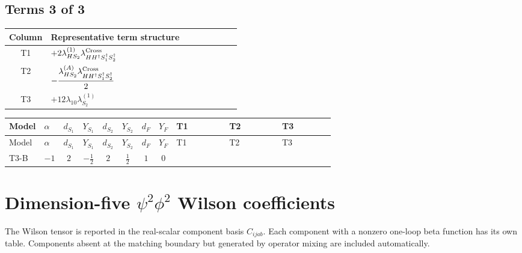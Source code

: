 \documentclass[8pt]{article}
\begin{document}
\begin{landscape}
\subsection*{Terms 3 of 3}
\begin{center}
\begin{tabular}{@{}c >{\raggedright\arraybackslash}p{0.82\linewidth}@{}}
\toprule
Column & Representative term structure \\
\midrule
T1 & \(\displaystyle +2 {\lambda_{HS_2}^{(1)}} {\lambda_{H H^\dagger S_1^\dagger S_2^\dagger}^{\rm Cross}}\) \\
\midrule
T2 & \(\displaystyle -\frac{{\lambda_{HS_2}^{(A)}} {\lambda_{H H^\dagger S_1^\dagger S_2^\dagger}^{\rm Cross}}}{2}\) \\
\midrule
T3 & \(\displaystyle +12 {\lambda_{10}} {\lambda_{S_2}^{(1)}}\) \\
\midrule
\bottomrule
\end{tabular}
\end{center}
\smallskip
\tiny
\begin{longtable}{@{}llcccccc >{\raggedright\arraybackslash}p{0.21\linewidth} >{\raggedright\arraybackslash}p{0.21\linewidth} >{\raggedright\arraybackslash}p{0.21\linewidth}@{}}
\toprule
Model & $\alpha$ & $d_{S_1}$ & $Y_{S_1}$ & $d_{S_2}$ & $Y_{S_2}$ & $d_F$ & $Y_F$ & T1 & T2 & T3 \\
\midrule
\endfirsthead
\toprule
Model & $\alpha$ & $d_{S_1}$ & $Y_{S_1}$ & $d_{S_2}$ & $Y_{S_2}$ & $d_F$ & $Y_F$ & T1 & T2 & T3 \\
\midrule
\endhead
T3-B & $-1$ & $2$ & $-\frac{1}{2}$ & $2$ & $\frac{1}{2}$ & $1$ & $0$ & \scriptsize\adjustbox{max width=\linewidth}{$\begin{gathered} +2 {\lambda_{HS_2}^{(1)}} {\lambda_{H H^\dagger S_1^\dagger S_2^\dagger}^{\rm Cross}}\end{gathered}$} & \scriptsize\adjustbox{max width=\linewidth}{$\begin{gathered} -\frac{{\lambda_{HS_2}^{(A)}} {\lambda_{H H^\dagger S_1^\dagger S_2^\dagger}^{\rm Cross}}}{2}\end{gathered}$} & \scriptsize\adjustbox{max width=\linewidth}{$\begin{gathered} +12 {\lambda_{10}} {\lambda_{S_2}^{(1)}}\end{gathered}$} \\
\midrule
\bottomrule
\end{longtable}
\clearpage
\section*{Dimension-five $\psi^2\phi^2$ Wilson coefficients}
The Wilson tensor is reported in the real-scalar component basis $C_{ijab}$. Each component with a nonzero one-loop beta function has its own table. Components absent at the matching boundary but generated by operator mixing are included automatically.

\end{landscape}
\end{document}
